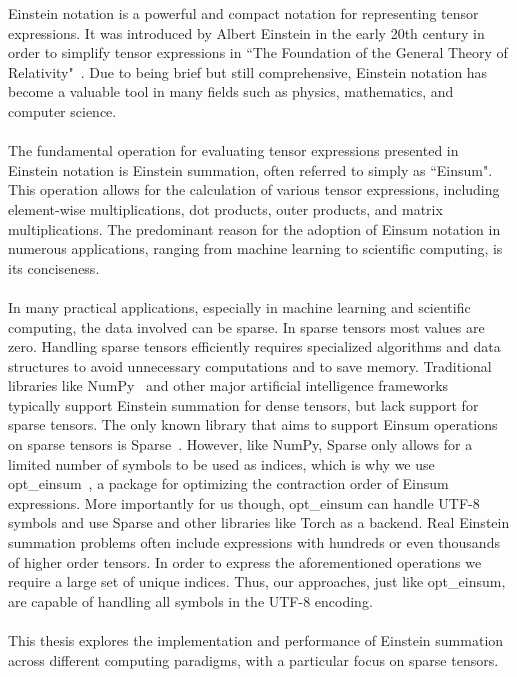 Einstein notation is a powerful and compact notation for representing
tensor expressions. It was introduced by Albert Einstein in the early 20th century
in order to simplify tensor expressions in ``The Foundation of the General Theory of
Relativity"~\cite{einstein1916}. Due to being brief but still comprehensive, Einstein
notation has become a valuable tool in many fields such as physics, mathematics, and
computer science.
\\\\
The fundamental operation for evaluating tensor expressions presented in Einstein
notation is Einstein summation, often referred to simply as ``Einsum". This operation
allows for the calculation of various tensor expressions, including element-wise
multiplications, dot products, outer products, and matrix multiplications. The predominant
reason for the adoption of Einsum notation in numerous applications, ranging from machine
learning to scientific computing, is its conciseness.
\\\\
In many practical applications, especially in machine learning and scientific computing,
the data involved can be sparse. In sparse tensors most values are zero. Handling sparse
tensors efficiently requires specialized algorithms and data structures to avoid
unnecessary computations and to save memory. Traditional libraries like NumPy~\cite{numpy}
and other major artificial intelligence frameworks~\cite{tensorflow, pytorch} typically
support Einstein summation for dense tensors, but lack support for sparse tensors. The only
known library that aims to support Einsum operations on sparse tensors is Sparse~\cite{sparse}.
However, like NumPy, Sparse only allows for a limited number of symbols to be used as
indices, which is why we use opt\_einsum~\cite{opt_einsum}, a package for optimizing the
contraction order of Einsum expressions. More importantly for us though, opt\_einsum can
handle UTF-8 symbols and use Sparse and other libraries like Torch as a backend. Real Einstein
summation problems often include expressions with hundreds or even thousands of higher order
tensors. In order to express the aforementioned operations we require a large set of unique
indices. Thus, our approaches, just like opt\_einsum, are capable of handling all symbols
in the UTF-8 encoding.
\\\\
This thesis explores the implementation and performance of Einstein summation
across different computing paradigms, with a particular focus on sparse tensors.

